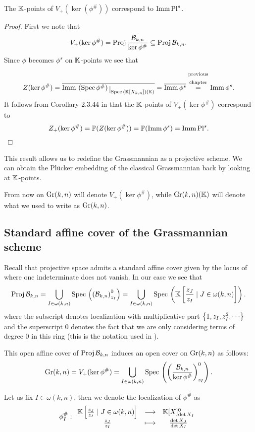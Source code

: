 \begin{proposition}
The $\mathbb{K}$-points of $V_+(\ker(\phi^\#))$ correspond to $\mathrm{Imm}\, \mathrm{Pl}^s$.
\end{proposition}
\begin{proof}
First we note that
\[V_+(\ker\phi^\#)=\mathrm{Proj}\,\frac{\mathcal{B}_{k,n}}{\ker\phi^\#}\subseteq \mathrm{Proj}\,\mathcal{B}_{k,n}.\]
Since $\phi$ becomes $\phi^s$ on $\mathbb{K}$-points we see that
\[Z(\ker\phi^\#)=\ol{\imm \pa{\Spec\phi^\#}\res{\Spec(\K[X_{k,n}])(\K)}}=\ol{\imm \phi^s}\pasgnl={$\emat{\text{previous}\\\text{chapter}}$}\imm \phi^s.\] 
It follows from Corollary 2.3.44 in \cite{QingLiu} that the $\mathbb{K}$-points of $V_+(\ker\phi^\#)$ correspond to 
\[Z_+(\ker\phi^\#)=\mathbb{P}(Z(\ker\phi^\#))=\mathbb{P}(\mathrm{Imm}\, \phi^s)=\mathrm{Imm}\, \mathrm{Pl}^s.\]
\end{proof}

\noindent This result allows us to redefine the Grassmannian as a projective scheme. We can obtain the Pl\"ucker embedding of the classical Grassmannian back by looking at $\mathbb{K}$-points.
\medskip

\noindent From now on $\mathrm{Gr}(k,n)$ will denote $V_+(\ker \phi^\#)$, while $\mathrm{Gr}(k,n)(\mathbb{K})$ will denote what we used to write as $\mathrm{Gr}(k,n)$.

\subsection{Standard affine cover of the Grassmannian scheme}
Recall that projective space admits a standard affine cover given by the locus of where one indeterminate does not vanish. In our case we see that
\[\mathrm{Proj}\, \mathcal{B}_{k,n}=\bigcup_{I\in\omega(k,n)}\mathrm{Spec}\, \left({\left({\mathcal{B}_{k,n}}\right)_{z_I}^0}\right)=\bigcup_{I\in\omega(k,n)}\mathrm{Spec}\, \left({\mathbb{K}\left[{\frac{z_J}{z_I}\mid J\in \omega(k,n)}\right]}\right).\]
where the subscript denotes localization with multiplicative part $\left\{{1,z_I,z_I^2,\cdots}\right\}$ and the superscript $0$ denotes the fact that we are only considering terms of degree $0$ in this ring (this is the notation used in \cite{QingLiu}).
\medskip

\noindent This open affine cover of $\mathrm{Proj}\,\mathcal{B}_{k,n}$ induces an open cover on $\mathrm{Gr}(k,n)$ as follows:
\[\mathrm{Gr}(k,n)=V_+(\ker\phi^\#)=\bigcup_{I\in \omega(k,n)}\mathrm{Spec}\,\left({\left({\frac{\mathcal{B}_{k,n}}{\ker\phi^\#}}\right)_{z_I}^0}\right).\]

\begin{notation}
Let us fix $I\in\omega(k,n)$, then we denote the localization of $\phi^\#$ as
\[\phi^\#_I:\begin{array}{ccc} {\mathbb{K}\left[{\frac{z_J}{z_I}\mid J\in \omega(k,n)}\right]} & \longrightarrow & {\mathbb{K}[X]_{\det X_I}^0}\\ {\frac{z_J}{z_I}} & \longmapsto & {\frac{\det X_J}{\det X_I}} \end{array}\]
\end{notation}

